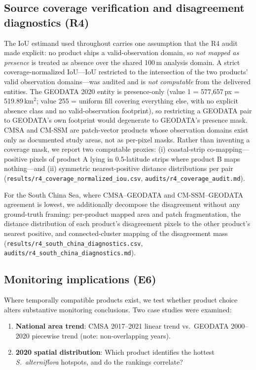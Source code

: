\documentclass[11pt]{article}
\begin{document}
\subsection{Source coverage verification and disagreement diagnostics (R4)}
\label{sec:methods-coverage}

The IoU estimand used throughout carries one assumption that the R4 audit
made explicit: no product ships a valid-observation domain, so
\emph{not mapped as presence} is treated as absence over the shared 100\,m
analysis domain. A strict coverage-normalized IoU---IoU restricted to the
intersection of the two products' valid observation domains---was audited
and is \emph{not computable} from the delivered entities. The GEODATA 2020
entity is presence-only (value 1 = 577,657\,px = 519.89\,km$^2$; value 255 =
uniform fill covering everything else, with no explicit absence class and
no valid-observation footprint), so restricting a GEODATA pair to GEODATA's
own footprint would degenerate to GEODATA's presence mask. CMSA and CM-SSM
are patch-vector products whose observation domains exist only as documented
study areas, not as per-pixel masks. Rather than inventing a coverage mask,
we report two computable proxies: (i) coastal-strip co-mapping---positive
pixels of product A lying in 0.5\textdegree{}-latitude strips where product
B maps nothing---and (ii) symmetric nearest-positive distance distributions
per pair (\texttt{results/r4\_coverage\_normalized\_iou.csv},
\texttt{audits/r4\_coverage\_audit.md}).

For the South China Sea, where CMSA--GEODATA and CM-SSM--GEODATA agreement is
lowest, we additionally decompose the disagreement without any ground-truth
framing: per-product mapped area and patch fragmentation, the distance
distribution of each product's disagreement pixels to the other product's
nearest positive, and connected-cluster mapping of the disagreement mass
(\texttt{results/r4\_south\_china\_diagnostics.csv},
\texttt{audits/r4\_south\_china\_diagnostics.md}).

\subsection{Monitoring implications (E6)}

Where temporally compatible products exist, we test whether product choice alters
substantive monitoring conclusions. Two case studies were examined:

\begin{enumerate}[nosep]
\item \textbf{National area trend}: CMSA 2017--2021 linear trend vs.\ GEODATA
  2000--2020 piecewise trend (note: non-overlapping years).
\item \textbf{2020 spatial distribution}: Which product identifies the hottest
  \textit{S.~alterniflora} hotspots, and do the rankings correlate?
\end{enumerate}
\end{document}
